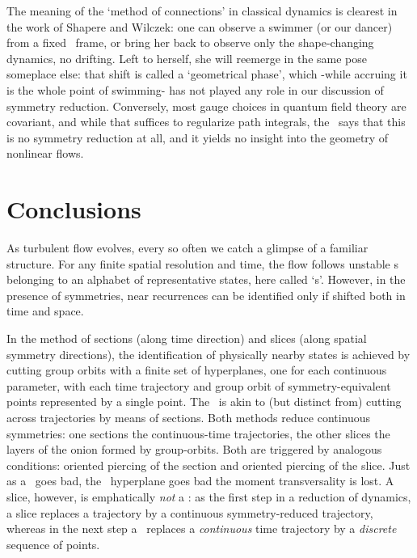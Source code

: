 \documentclass[aip,cha,reprint,
secnumarabic,
nofootinbib, tightenlines,
nobibnotes, showkeys, showpacs,
groupedaddress
]{revtex4-1}
\begin{document}
The meaning of the `method of
connections' in classical dynamics is clearest in the work of Shapere
and Wilczek: one can observe a swimmer (or our dancer)
from a fixed \slice\ frame, or bring her back to observe only the
shape-changing dynamics, no drifting. Left to herself, she will reemerge
in the same pose someplace else: that shift is called a `geometrical
phase', which -while accruing it is the whole point of swimming- has not
played any role in our discussion of symmetry reduction. Conversely, most
gauge choices in quantum field theory are covariant, and while that
suffices to regularize path integrals, the \mslices\ says that this is no
symmetry reduction at all, and it yields no insight into the geometry of
nonlinear flows.



\section{Conclusions}
\label{s:concl}

As turbulent flow evolves, every so often we catch a glimpse of a
familiar structure. For any finite spatial resolution and time, the flow
follows  unstable {\cohStr s} belonging to an alphabet of representative
states, here called `\template s'. However, in the presence of
symmetries, near recurrences can be identified only if shifted both in
time and space.

In the method of sections (along time direction) and slices (along
spatial symmetry directions), the identification of physically nearby
states is achieved by cutting group orbits with a finite set of
hyperplanes, one for each continuous parameter, with each time trajectory
and group orbit of symmetry-equivalent points represented by a single
point. The \mslices\ is akin to (but distinct
from) cutting across trajectories by means of sections. Both methods
reduce continuous symmetries: one sections the continuous-time
trajectories, the other slices the layers of the onion formed by
group-orbits. Both are triggered by analogous conditions: oriented
piercing of the section and oriented piercing of the slice. Just as a
\PoincSec\ goes bad, the \slice\ hyperplane goes bad the moment
transversality is lost. A slice, however, is emphatically \emph{not} a
\PoincSec:
as the first step in a reduction of dynamics, a slice replaces a trajectory
by a continuous symmetry-reduced trajectory, whereas in the next step a
\PoincSec\ replaces a \emph{continuous} time trajectory by a
\emph{discrete} sequence of points.
\end{document}
